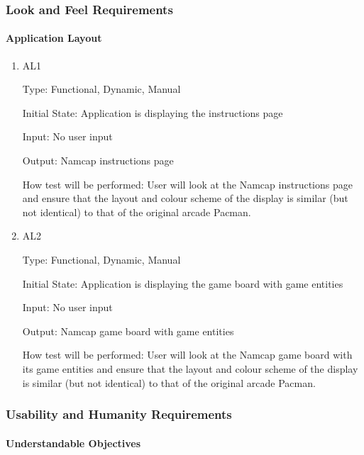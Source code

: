 \documentclass[12pt, titlepage]{article}
\begin{document}
\subsubsection{Look and Feel Requirements}
		
\paragraph{Application Layout}

\begin{enumerate}

\item{AL1\\}

Type: Functional, Dynamic, Manual
					
Initial State: Application is displaying the instructions page
					
Input: No user input
					
Output: Namcap instructions page
					
How test will be performed: User will look at the Namcap instructions page and ensure that the layout and colour scheme of the display is similar (but not identical) to that of the original arcade Pacman.
					
\item{AL2\\}

Type: Functional, Dynamic, Manual
					
Initial State: Application is displaying the game board with game entities
					
Input: No user input
					
Output: Namcap game board with game entities
					
How test will be performed: User will look at the Namcap game board with its game entities and ensure that the layout and colour scheme of the display is similar (but not identical) to that of the original arcade Pacman.

\end{enumerate}

\subsubsection{Usability and Humanity Requirements}

\paragraph{Understandable Objectives}
\end{document}
